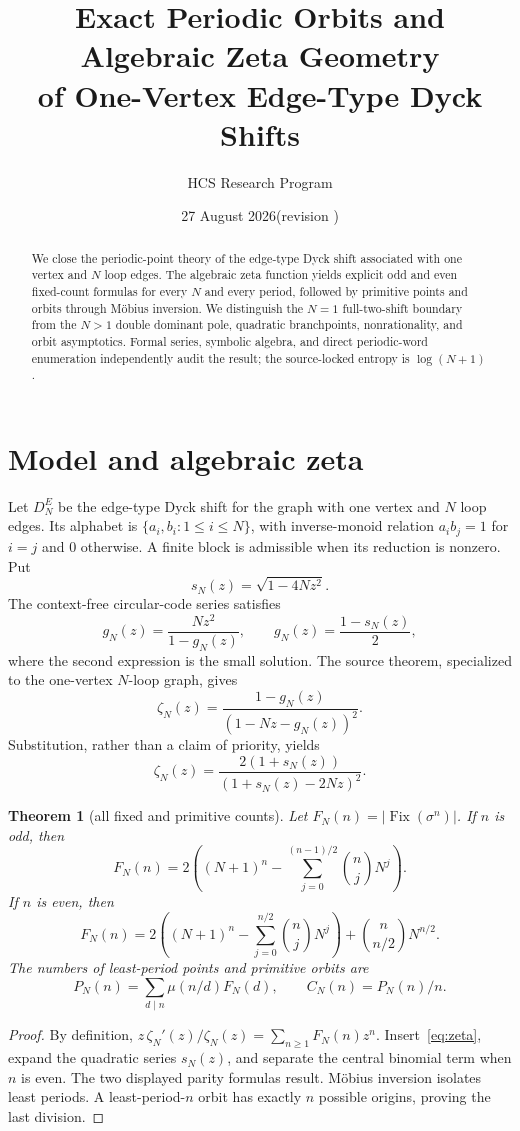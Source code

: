 \documentclass[11pt]{article}
\title{Exact Periodic Orbits and Algebraic Zeta Geometry\\
of One-Vertex Edge-Type Dyck Shifts}
\author{HCS Research Program}
\date{27 August 2026\quad (revision \CRevisionRound)}
\newtheorem{theorem}{Theorem}
\newcommand{\Fix}{\operatorname{Fix}}
\begin{document}
\maketitle
\begin{abstract}
We close the periodic-point theory of the edge-type Dyck shift associated with
one vertex and $N$ loop edges.  The algebraic zeta function yields explicit
odd and even fixed-count formulas for every $N$ and every period, followed by
primitive points and orbits through M\"obius inversion.  We distinguish the
$N=1$ full-two-shift boundary from the $N>1$ double dominant pole, quadratic
branchpoints, nonrationality, and orbit asymptotics.  Formal series, symbolic
algebra, and direct periodic-word enumeration independently audit the result;
the source-locked entropy is $\log(N+1)$.
\end{abstract}

\section{Model and algebraic zeta}
Let $D_N^E$ be the edge-type Dyck shift for the graph with one vertex and $N$
loop edges.  Its alphabet is
$\{a_i,b_i:1\le i\le N\}$, with inverse-monoid relation
$a_i b_j=1$ for $i=j$ and $0$ otherwise.  A finite block is admissible when
its reduction is nonzero.  Put
\[
 s_N(z)=\sqrt{1-4Nz^2}.
\]
The context-free circular-code series satisfies
\[
 g_N(z)=\frac{Nz^2}{1-g_N(z)},\qquad
 g_N(z)=\frac{1-s_N(z)}2,
\]
where the second expression is the small solution.  The source theorem,
specialized to the one-vertex $N$-loop graph, gives
\[
 \zeta_N(z)=\frac{1-g_N(z)}{(1-Nz-g_N(z))^2}.
\]
Substitution, rather than a claim of priority, yields
\begin{equation}\label{eq:zeta}
 \zeta_N(z)=\frac{2(1+s_N(z))}
 {(1+s_N(z)-2Nz)^2}.
\end{equation}

\begin{theorem}[all fixed and primitive counts]\label{thm:counts}
Let $F_N(n)=|\Fix(\sigma^n)|$.  If $n$ is odd, then
\[
 F_N(n)=2\left((N+1)^n-
 \sum_{j=0}^{(n-1)/2}\binom njN^j\right).
\]
If $n$ is even, then
\[
 F_N(n)=2\left((N+1)^n-
 \sum_{j=0}^{n/2}\binom njN^j\right)
 +\binom n{n/2}N^{n/2}.
\]
The numbers of least-period points and primitive orbits are
\[
 P_N(n)=\sum_{d\mid n}\mu(n/d)F_N(d),\qquad C_N(n)=P_N(n)/n.
\]
\end{theorem}

\begin{proof}
By definition,
$z\,\zeta_N'(z)/\zeta_N(z)=\sum_{n\ge1}F_N(n)z^n$.
Insert~\eqref{eq:zeta}, expand the quadratic series $s_N(z)$, and separate the
central binomial term when $n$ is even.  The two displayed parity formulas
result.  M\"obius inversion isolates least periods.  A least-period-$n$ orbit
has exactly $n$ possible origins, proving the last division.
\end{proof}
\end{document}
